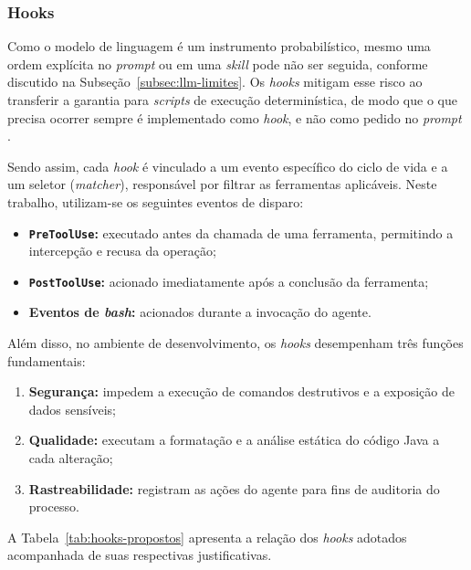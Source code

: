 \subsubsection{Hooks}
\label{subsubsec:hooks}

Como o modelo de linguagem é um instrumento probabilístico, mesmo uma ordem explícita no \textit{prompt} ou em uma \textit{skill} pode não ser seguida, conforme discutido na Subseção~\ref{subsec:llm-limites}. Os \textit{hooks} mitigam esse risco ao transferir a garantia para \textit{scripts} de execução determinística, de modo que o que precisa ocorrer sempre é implementado como \textit{hook}, e não como pedido no \textit{prompt} \cite{anthropic_academy}.

Sendo assim, cada \textit{hook} é vinculado a um evento específico do ciclo de vida e a um seletor (\textit{matcher}), responsável por filtrar as ferramentas aplicáveis. Neste trabalho, utilizam-se os seguintes eventos de disparo:

\begin{itemize}[label=-]
    \item \textbf{\texttt{PreToolUse}:} executado antes da chamada de uma ferramenta, permitindo a intercepção e recusa da operação;
    \item \textbf{\texttt{PostToolUse}:} acionado imediatamente após a conclusão da ferramenta;
    \item \textbf{Eventos de \textit{bash}:} acionados durante a invocação do agente.
\end{itemize}

Além disso, no ambiente de desenvolvimento, os \textit{hooks} desempenham três funções fundamentais:

\begin{enumerate}
    \item \textbf{Segurança:} impedem a execução de comandos destrutivos e a exposição de dados sensíveis;
    \item \textbf{Qualidade:} executam a formatação e a análise estática do código Java a cada alteração;
    \item \textbf{Rastreabilidade:} registram as ações do agente para fins de auditoria do processo.
\end{enumerate}

A Tabela~\ref{tab:hooks-propostos} apresenta a relação dos \textit{hooks} adotados acompanhada de suas respectivas justificativas.

